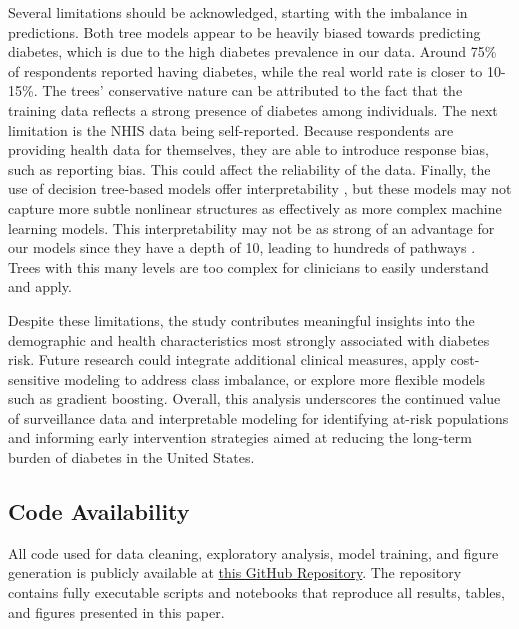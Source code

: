 \documentclass{article}
\theoremstyle{plain}
\theoremstyle{definition}
\theoremstyle{remark}
\begin{document}
Several limitations should be acknowledged, starting with the imbalance in predictions. Both tree models appear to be heavily biased towards predicting diabetes, which is due to the high diabetes prevalence in our data. Around 75\% of respondents reported having diabetes, while the real world rate is closer to 10-15\%. The trees' conservative nature can be attributed to the fact that the training data reflects a strong presence of diabetes among individuals. The next limitation is the NHIS data being self-reported. Because respondents are providing health data for themselves, they are able to introduce response bias, such as reporting bias. This could affect the reliability of the data. Finally, the use of decision tree-based models offer interpretability , but these models may not capture more subtle nonlinear structures as effectively as more complex machine learning models.  This interpretability may not be as strong of an advantage for our models since they have a depth of 10, leading to hundreds of pathways . Trees with this many levels are too complex for clinicians to easily understand and apply. 

Despite these limitations, the study contributes meaningful insights into the demographic and health characteristics most strongly associated with diabetes risk. Future research could integrate additional clinical measures, apply cost-sensitive modeling to address class imbalance, or explore more flexible models such as gradient boosting. Overall, this analysis underscores the continued value of surveillance data and interpretable modeling for identifying at-risk populations and informing early intervention strategies aimed at reducing the long-term burden of diabetes in the United States. 

\subsection*{Code Availability}
All code used for data cleaning, exploratory analysis, model training, and figure generation is publicly available at \href{https://github.com/nladocsi/DS3001_F25_Project/tree/main/DS_3001_Paper}{this GitHub Repository}. The repository contains fully executable scripts and notebooks that reproduce all results, tables, and figures presented in this paper.




\end{document}
